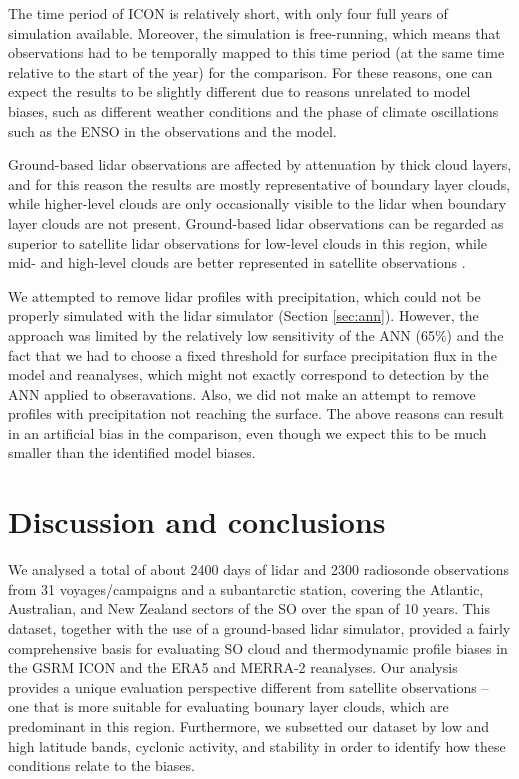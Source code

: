 \documentclass[12pt,a4paper]{article}
\begin{document}
The time period of ICON is relatively short, with only four full years of
simulation available. Moreover, the simulation is free-running, which means
that observations had to be temporally mapped to this time period (at the same
time relative to the start of the year) for the comparison. For these reasons,
one can expect the results to be slightly different due to reasons unrelated to
model biases, such as different weather conditions and the phase of climate
oscillations such as the ENSO in the observations and the model.

Ground-based lidar observations are affected by attenuation by thick cloud
layers, and for this reason the results are mostly representative of boundary
layer clouds, while higher-level clouds are only occasionally visible to the
lidar when boundary layer clouds are not present. Ground-based lidar
observations can be regarded as superior to satellite lidar observations for
low-level clouds in this region, while mid- and high-level clouds are better
represented in satellite observations \citep{mcerlich2021}.

We attempted to remove lidar profiles with precipitation, which could not be
properly simulated with the lidar simulator (Section \ref{sec:ann}). However,
the approach was limited by the relatively low sensitivity of the ANN (65\%)
and the fact that we had to choose a fixed threshold for surface precipitation
flux in the model and reanalyses, which might not exactly correspond to
detection by the ANN applied to obseravations. Also, we did not make an attempt
to remove profiles with precipitation not reaching the surface. The above
reasons can result in an artificial bias in the comparison, even though we
expect this to be much smaller than the identified model biases.

\section{Discussion and conclusions}

We analysed a total of about 2400 days of lidar and 2300 radiosonde
observations from 31 voyages/campaigns and a subantarctic station, covering the
Atlantic, Australian, and New Zealand sectors of the SO over the span of 10
years. This dataset, together with the use of a ground-based lidar simulator,
provided a fairly comprehensive basis for evaluating SO cloud and thermodynamic
profile biases in the GSRM ICON and the ERA5 and MERRA-2 reanalyses. Our
analysis provides a unique evaluation perspective different from satellite
observations -- one that is more suitable for evaluating bounary layer clouds,
which are predominant in this region. Furthermore, we subsetted our dataset by
low and high latitude bands, cyclonic activity, and stability in order to
identify how these conditions relate to the biases.
\end{document}
